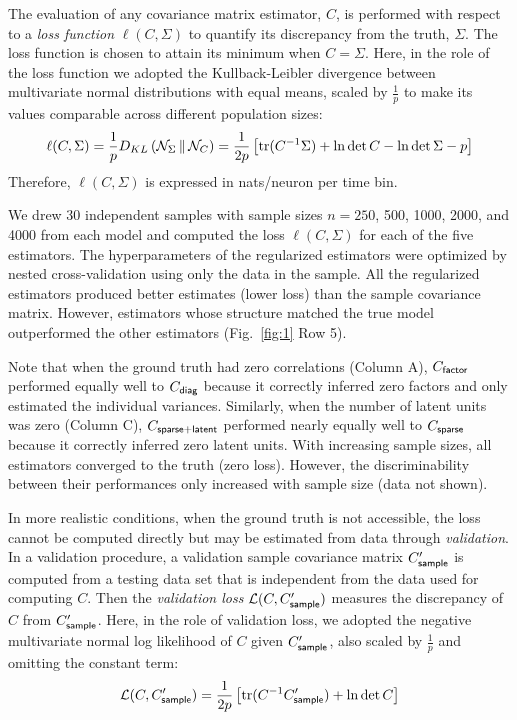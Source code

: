 The evaluation of any covariance matrix estimator, $C$, is performed with respect to a \emph{loss function} $\ell(C,\Sigma)$ to quantify its discrepancy from the truth, $\Sigma$.  The loss function is chosen to attain its minimum when $C=\Sigma$.
Here, in the role of the loss function we adopted the Kullback-Leibler divergence between multivariate normal distributions with equal means, scaled by $\frac 1 p$ to make its values comparable across different population sizes: 
\begin{equation}\label{eq:loss}
    \ell(C,\Sigma) = 
    \frac 1 p D_{KL}\left(\mathcal N_\Sigma\,\Vert\,\mathcal N_C\right) = 
    \frac 1 {2p} \left[\operatorname{tr}(C^{-1}\Sigma) + \ln\det C - \ln\det\Sigma - p\right] 
\end{equation}
Therefore, $\ell(C,\Sigma)$ is expressed in nats/neuron per time bin.

We drew 30 independent samples with sample sizes $n=250$, 500, 1000, 2000, and 4000 from each model and computed the loss $\ell(C,\Sigma)$ for each of the five estimators.  
The hyperparameters of the regularized estimators were optimized by nested cross-validation using only the data in the sample.  
All the regularized estimators produced better estimates (lower loss) than the sample covariance matrix.  
However, estimators whose structure matched the true model outperformed the other estimators (Fig.~\ref{fig:1} Row 5).

Note that when the ground truth had zero correlations (Column A), $C_{\sf factor}$ performed equally well to $C_{\sf diag}$ because it correctly inferred zero factors and only estimated the individual variances. 
Similarly, when the number of latent units was zero (Column C), $C_{\sf sparse+latent}$ performed nearly equally well to $C_{\sf sparse}$ because it correctly inferred zero latent units.
With increasing sample sizes, all estimators converged to the truth (zero loss).  
However, the discriminability between their performances only increased with sample size (data not shown).

In more realistic conditions, when the ground truth is not accessible, the loss cannot be computed directly but may be estimated from data through \emph{validation}.
In a validation procedure, a validation sample covariance matrix $C_{\sf sample}^\prime$ is computed from a testing data set that is independent from the data used for computing $C$.
Then the \emph{validation loss} $\mathcal L(C,C^\prime_{\sf sample})$ measures the discrepancy of $C$ from $C^\prime_{\sf sample}$. 
Here, in the role of validation loss, we adopted the negative multivariate normal log likelihood of $C$ given $C^\prime_{\sf sample}$, also scaled by $\frac 1 p$ and omitting the constant term: 
\begin{equation}\label{eq:vloss}
    \mathcal L(C,C^\prime_{\sf sample}) = \frac 1 {2p} \left[\operatorname{tr}(C^{-1}C^\prime_{\sf sample})+\ln\det C \right]
\end{equation}

